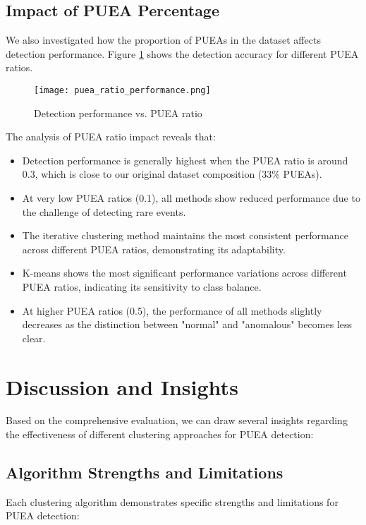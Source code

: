 \subsection{Impact of PUEA Percentage}
We also investigated how the proportion of PUEAs in the dataset affects detection performance. Figure \ref{fig:puea_ratio_performance} shows the detection accuracy for different PUEA ratios.

\begin{figure}[h]
    \centering
    \texttt{[image: puea\_ratio\_performance.png]}
    \caption{Detection performance vs. PUEA ratio}
    \label{fig:puea_ratio_performance}
\end{figure}

The analysis of PUEA ratio impact reveals that:
\begin{itemize}
    \item Detection performance is generally highest when the PUEA ratio is around 0.3, which is close to our original dataset composition (33\% PUEAs).
    \item At very low PUEA ratios (0.1), all methods show reduced performance due to the challenge of detecting rare events.
    \item The iterative clustering method maintains the most consistent performance across different PUEA ratios, demonstrating its adaptability.
    \item K-means shows the most significant performance variations across different PUEA ratios, indicating its sensitivity to class balance.
    \item At higher PUEA ratios (0.5), the performance of all methods slightly decreases as the distinction between "normal" and "anomalous" becomes less clear.
\end{itemize}

\section{Discussion and Insights}
Based on the comprehensive evaluation, we can draw several insights regarding the effectiveness of different clustering approaches for PUEA detection:

\subsection{Algorithm Strengths and Limitations}
Each clustering algorithm demonstrates specific strengths and limitations for PUEA detection:

